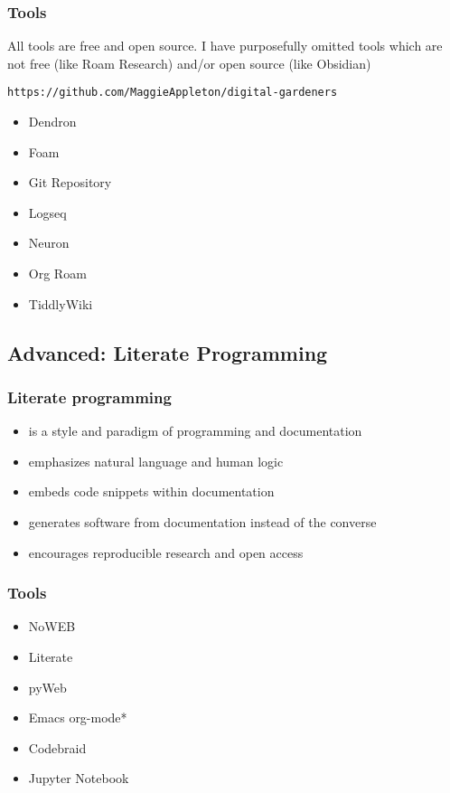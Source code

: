 \documentclass[11pt]{article}
\begin{document}
\subsubsection*{Tools}
\label{sec:orgeb44e28}
All tools are free and open source.
I have purposefully omitted tools which are not free (like Roam Research) and/or open source (like Obsidian)

\texttt{https://github.com/MaggieAppleton/digital-gardeners}

\begin{itemize}
\item Dendron
\item Foam
\item Git Repository
\item Logseq
\item Neuron
\item Org Roam
\item TiddlyWiki
\end{itemize}

\subsection*{Advanced: Literate Programming}
\label{sec:orga66a5e8}
\subsubsection*{Literate programming}
\label{sec:org05b44c5}
\begin{itemize}
\item is a style and paradigm of programming and documentation
\item emphasizes natural language and human logic
\item embeds code snippets within documentation
\item generates software from documentation instead of the converse
\item encourages reproducible research and open access
\end{itemize}

\subsubsection*{Tools}
\label{sec:org339b2fd}
\begin{itemize}
\item NoWEB
\item Literate
\item pyWeb
\item Emacs org-mode*
\item Codebraid
\item Jupyter Notebook
\end{itemize}
\end{document}
